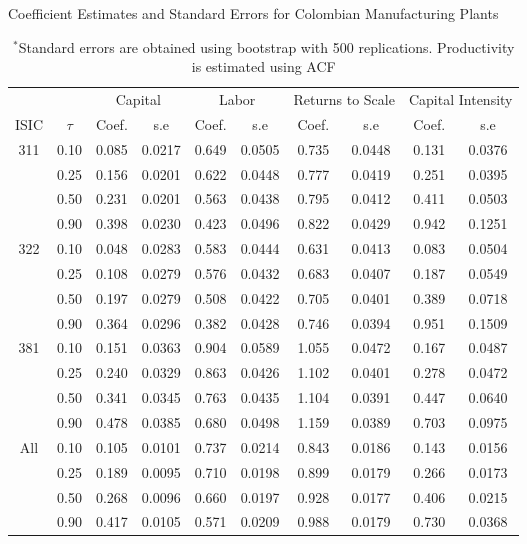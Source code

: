 \documentclass[11pt]{article}
\begin{document}
\begin{table}[H]
\centering
\caption{Coefficient Estimates and Standard Errors for Colombian Manufacturing Plants}
\begin{tabular}{cccccccccc}
  \hline\hline & & \multicolumn{2}{c}{Capital}  & \multicolumn{2}{c}{Labor} & \multicolumn{2}{c}{Returns to Scale} & \multicolumn{2}{c}{Capital Intensity}\\ \cmidrule(lr){3-4} \cmidrule(lr){5-6} \cmidrule(lr){7-8} \cmidrule(lr){9-10}ISIC & $\tau$ & Coef. & s.e & Coef. & s.e & Coef. & s.e & Coef. & s.e \\ 
  \hline
311 & 0.10 & 0.085 & 0.0217 & 0.649 & 0.0505 & 0.735 & 0.0448 & 0.131 & 0.0376 \\ 
   & 0.25 & 0.156 & 0.0201 & 0.622 & 0.0448 & 0.777 & 0.0419 & 0.251 & 0.0395 \\ 
   & 0.50 & 0.231 & 0.0201 & 0.563 & 0.0438 & 0.795 & 0.0412 & 0.411 & 0.0503 \\ 
   & 0.90 & 0.398 & 0.0230 & 0.423 & 0.0496 & 0.822 & 0.0429 & 0.942 & 0.1251 \\ 
  322 & 0.10 & 0.048 & 0.0283 & 0.583 & 0.0444 & 0.631 & 0.0413 & 0.083 & 0.0504 \\ 
   & 0.25 & 0.108 & 0.0279 & 0.576 & 0.0432 & 0.683 & 0.0407 & 0.187 & 0.0549 \\ 
   & 0.50 & 0.197 & 0.0279 & 0.508 & 0.0422 & 0.705 & 0.0401 & 0.389 & 0.0718 \\ 
   & 0.90 & 0.364 & 0.0296 & 0.382 & 0.0428 & 0.746 & 0.0394 & 0.951 & 0.1509 \\ 
  381 & 0.10 & 0.151 & 0.0363 & 0.904 & 0.0589 & 1.055 & 0.0472 & 0.167 & 0.0487 \\ 
   & 0.25 & 0.240 & 0.0329 & 0.863 & 0.0426 & 1.102 & 0.0401 & 0.278 & 0.0472 \\ 
   & 0.50 & 0.341 & 0.0345 & 0.763 & 0.0435 & 1.104 & 0.0391 & 0.447 & 0.0640 \\ 
   & 0.90 & 0.478 & 0.0385 & 0.680 & 0.0498 & 1.159 & 0.0389 & 0.703 & 0.0975 \\ 
  All & 0.10 & 0.105 & 0.0101 & 0.737 & 0.0214 & 0.843 & 0.0186 & 0.143 & 0.0156 \\ 
   & 0.25 & 0.189 & 0.0095 & 0.710 & 0.0198 & 0.899 & 0.0179 & 0.266 & 0.0173 \\ 
   & 0.50 & 0.268 & 0.0096 & 0.660 & 0.0197 & 0.928 & 0.0177 & 0.406 & 0.0215 \\ 
   & 0.90 & 0.417 & 0.0105 & 0.571 & 0.0209 & 0.988 & 0.0179 & 0.730 & 0.0368 \\ 
   \hline
\end{tabular}
\caption*{\footnotesize $^{*}$Standard errors are obtained using bootstrap with 500 replications. Productivity is estimated using ACF}
\label{COLestACF}
\end{table}
\end{document}
